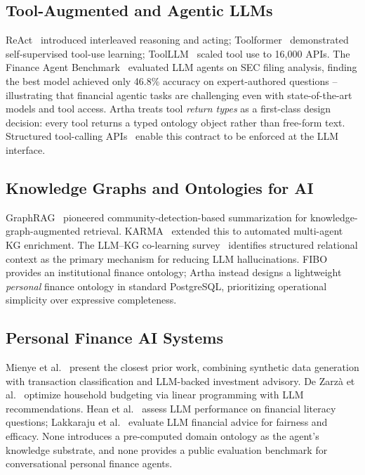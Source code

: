 \documentclass[conference]{IEEEtran}
\begin{document}
\subsection{Tool-Augmented and Agentic LLMs}

ReAct~\cite{react} introduced interleaved reasoning and acting;
Toolformer~\cite{toolformer} demonstrated self-supervised tool-use
learning; ToolLLM~\cite{toolllm} scaled tool use to 16{,}000 APIs.
The Finance Agent Benchmark~\cite{finance_agent_benchmark}
evaluated LLM agents on SEC filing analysis, finding the best model
achieved only 46.8\% accuracy on expert-authored questions --
illustrating that financial agentic tasks are challenging even with
state-of-the-art models and tool access. Artha treats tool
\emph{return types} as a first-class design decision: every tool
returns a typed ontology object rather than free-form text.
Structured tool-calling APIs~\cite{anthropic_tools} enable this
contract to be enforced at the LLM interface.

\subsection{Knowledge Graphs and Ontologies for AI}

GraphRAG~\cite{graphrag} pioneered community-detection-based
summarization for knowledge-graph-augmented retrieval.
KARMA~\cite{karma} extended this to automated multi-agent KG
enrichment. The LLM--KG co-learning survey~\cite{pan_llm_kg}
identifies structured relational context as the primary mechanism
for reducing LLM hallucinations. FIBO~\cite{fibo} provides an
institutional finance ontology; Artha instead designs a lightweight
\emph{personal} finance ontology in standard PostgreSQL,
prioritizing operational simplicity over expressive completeness.

\subsection{Personal Finance AI Systems}

Mienye et al.~\cite{mienye2026} present the closest prior work,
combining synthetic data generation with transaction classification
and LLM-backed investment advisory. De Zarz\`a et al.~\cite{dezarza}
optimize household budgeting via linear programming with LLM
recommendations. Hean et al.~\cite{hean} assess LLM performance on
financial literacy questions; Lakkaraju et al.~\cite{lakkaraju}
evaluate LLM financial advice for fairness and efficacy. None
introduces a pre-computed domain ontology as the agent's knowledge
substrate, and none provides a public evaluation benchmark for
conversational personal finance agents.
\end{document}
